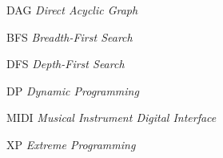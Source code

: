 \begin{siglas}
  \item[DAG] \textit{Direct Acyclic Graph}
  \item[BFS] \textit{Breadth-First Search}
  \item[DFS] \textit{Depth-First Search}
  \item[DP] \textit{Dynamic Programming}
  \item[MIDI] \textit{Musical Instrument Digital Interface}
  \item[XP] \textit{Extreme Programming}
\end{siglas}
